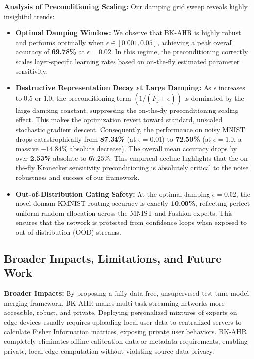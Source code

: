 \documentclass{article}
\theoremstyle{plain}
\theoremstyle{definition}
\theoremstyle{remark}
\begin{document}
\textbf{Analysis of Preconditioning Scaling:}
Our damping grid sweep reveals highly insightful trends:
\begin{itemize}
  \item \textbf{Optimal Damping Window:} We observe that BK-AHR is highly robust and performs optimally when $\epsilon \in [0.001, 0.05]$, achieving a peak overall accuracy of \textbf{69.78\%} at $\epsilon = 0.02$. In this regime, the preconditioning correctly scales layer-specific learning rates based on on-the-fly estimated parameter sensitivity.
  \item \textbf{Destructive Representation Decay at Large Damping:} As $\epsilon$ increases to $0.5$ or $1.0$, the preconditioning term $(1 / (\tilde{F}_j + \epsilon))$ is dominated by the large damping constant, suppressing the on-the-fly preconditioning scaling effect. This makes the optimization revert toward standard, unscaled stochastic gradient descent. Consequently, the performance on noisy MNIST drops catastrophically from \textbf{87.34\%} (at $\epsilon = 0.01$) to \textbf{72.50\%} (at $\epsilon = 1.0$, a massive $-14.84\%$ absolute decrease). The overall mean accuracy drops by over \textbf{2.53\%} absolute to $67.25\%$. This empirical decline highlights that the on-the-fly Kronecker sensitivity preconditioning is absolutely critical to the noise robustness and success of our framework.
  \item \textbf{Out-of-Distribution Gating Safety:} At the optimal damping $\epsilon = 0.02$, the novel domain KMNIST routing accuracy is exactly \textbf{10.00\%}, reflecting perfect uniform random allocation across the MNIST and Fashion experts. This ensures that the network is protected from confidence loops when exposed to out-of-distribution (OOD) streams.
\end{itemize}

\subsection{Broader Impacts, Limitations, and Future Work}
\label{subsec:impacts}

\textbf{Broader Impacts:}
By proposing a fully data-free, unsupervised test-time model merging framework, BK-AHR makes multi-task streaming networks more accessible, robust, and private. Deploying personalized mixtures of experts on edge devices usually requires uploading local user data to centralized servers to calculate Fisher Information matrices, exposing private user behaviors. BK-AHR completely eliminates offline calibration data or metadata requirements, enabling private, local edge computation without violating source-data privacy.
\end{document}
